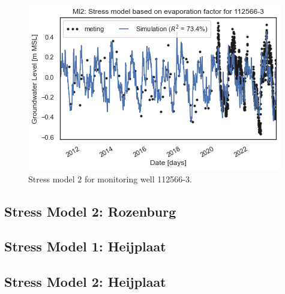\begin{figure}[htbp]
\begin{minipage}{0.32\textwidth}
    \end{minipage}
    \hfill
    \begin{minipage}{0.32\textwidth}
        \centering
        \includegraphics[width=\linewidth]{figures/results/ml2 112566-3.png}
        \caption{Stress model 2 for monitoring well 112566-3.}
        \label{fig:112565-3}
    \end{minipage}
\end{figure}

\subsection{Stress Model 2: Rozenburg}



\subsection{Stress Model 1: Heijplaat}


\subsection{Stress Model 2: Heijplaat}
